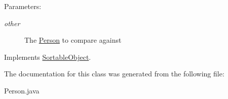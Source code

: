 \begin{Desc}
\item[Parameters:]
\begin{description}
\item[{\em other}]The \hyperlink{class_person}{Person} to compare against \end{description}
\end{Desc}


Implements \hyperlink{class_sortable_object_b8f80361da32c8b04d89116993e60847}{SortableObject}.

The documentation for this class was generated from the following file:\begin{CompactItemize}
\item 
Person.java\end{CompactItemize}
